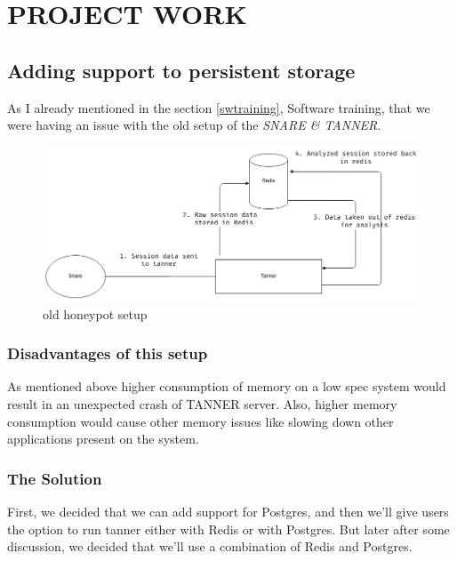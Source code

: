 \newpage
\thispagestyle{empty}
\chapter{PROJECT WORK}
\section{Adding support to persistent storage}

As I already mentioned in the section \ref{swtraining}, Software training, that we were having an issue with the old setup of the \textit{SNARE \& TANNER}. 
\begin{figure}[h!]
    \centering  
    \includegraphics[width=.9\textwidth]{old-setup}
    \caption{old honeypot setup}
    \label{fig:1}
\end{figure}
\subsection{Disadvantages of this setup}
As mentioned above higher consumption of memory on a low spec system would result in an unexpected crash of TANNER server. Also, higher memory consumption would cause other memory issues like slowing down other applications present on the system.
\subsection{The Solution}
First, we decided that we can add support for Postgres, and then we'll give users the option to run tanner either with Redis or with Postgres. But later after some discussion, we decided that we'll use a combination of Redis and Postgres.

